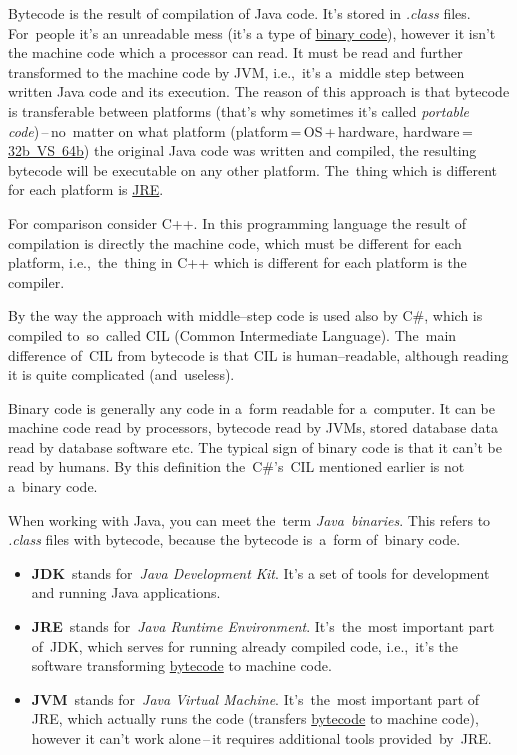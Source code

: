 \label{bytecode}
Bytecode is the result of compilation of Java code. It's stored in \textit{.class} files. For~people it's an unreadable mess (it's a type of \hyperref[bytecodebinarycode]{binary code}), however it isn't the machine code which a processor can read. It must be read and further transformed to the machine code by JVM, i.e.,~it's a~middle step between written Java code and its execution. The reason of this approach is that bytecode is transferable between platforms (that's why sometimes it's called \textit{portable code})\,--\,no~matter on what platform (platform\,=\,OS\,+\,hardware, hardware\,=\,\hyperref[32bvs64b]{32b~VS~64b}) the original Java code was written and compiled, the resulting bytecode will be executable on any other platform. The~thing which is different for each platform is \hyperref[jdkjrejvm]{JRE}.

For comparison consider C++. In this programming language the result of compilation is directly the machine code, which must be different for each platform, i.e.,~the~thing in C++ which is different for each platform is the compiler.

By the way the approach with middle--step code is used also by C\#, which is compiled to~so~called CIL (Common Intermediate Language). The~main difference of~CIL from bytecode is that CIL is human--readable, although reading it is quite complicated (and~useless).

\label{bytecodebinarycode}
Binary code is generally any code in a~form readable for a~computer. It can be machine code read by processors, bytecode read by JVMs, stored database data read by database software etc. The typical sign of binary code is that it can't be read by humans. By this definition the~C\#'s~CIL mentioned earlier is not a~binary code.

When working with Java, you can meet the~term \textit{Java~binaries}. This refers to \textit{.class} files with bytecode, because the bytecode is~a~form of~binary code.

\label{jdkjrejvm}
\begin{itemize}
    \item \textbf{JDK}~stands for~\textit{Java Development Kit}. It's a set of tools for development and running Java applications.
    \item \textbf{JRE}~stands for~\textit{Java Runtime Environment}. It's~the~most important part of~JDK, which serves for running already compiled code, i.e.,~it's the software transforming \hyperref[bytecode]{bytecode} to machine code.
    \item \textbf{JVM}~stands for~\textit{Java Virtual Machine}. It's~the~most important part of JRE, which actually runs the code (transfers \hyperref[bytecode]{bytecode} to machine code), however it can't work alone\,--\,it requires additional tools provided~by~JRE.
\end{itemize}

